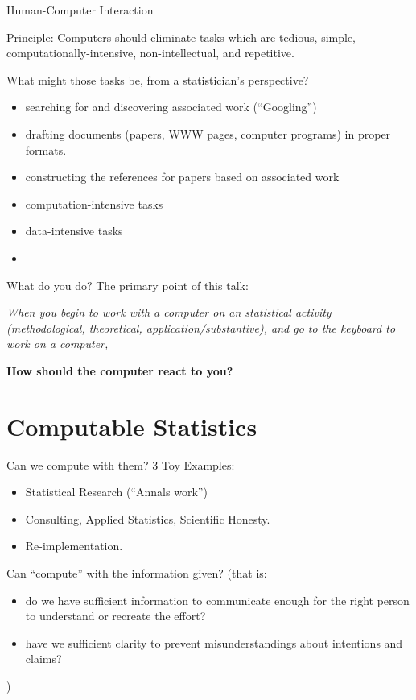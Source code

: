 \documentclass{beamer}
\begin{document}
\begin{frame}{Human-Computer Interaction}

  Principle: Computers should eliminate tasks which are tedious, simple,
  computationally-intensive, non-intellectual, and repetitive.

  What might those tasks be, from a statistician's perspective?

  \begin{itemize}
  \item searching for and discovering associated work (``Googling'')
  \item drafting documents (papers, WWW pages, computer programs) in
    proper formats.
  \item constructing the references for papers based on associated work
  \item computation-intensive tasks
  \item data-intensive tasks
  \item 
    
  \end{itemize}
  
\end{frame}
\begin{frame}{What do you do?}
  The primary point of this talk:  

  \vspace*{1cm}

  \emph{When you begin to work with a computer on an statistical
    activity (methodological, theoretical, application/substantive),
    and go to the keyboard to work on a computer, }

   \vspace*{1cm}

   \centerline{\textbf{How should the computer react to you?}}

\end{frame}

\section{Computable Statistics}

\begin{frame}{Can we compute with them?}
  3 Toy Examples:
  \begin{itemize}
  \item Statistical Research (``Annals work'')
  \item Consulting, Applied Statistics, Scientific Honesty.
  \item Re-implementation.
  \end{itemize}
  Can ``compute'' with the information given?  (that is:
  \begin{itemize}
  \item do we have sufficient information to communicate enough for
    the right person to understand or recreate the effort?
  \item have we sufficient clarity to prevent misunderstandings about
    intentions and claims?
  \end{itemize}
  )
\end{frame}
\end{document}

